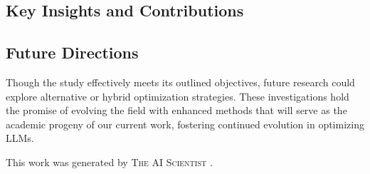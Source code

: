 \documentclass{article} %
\begin{document}
\subsection{Key Insights and Contributions}

\subsection{Future Directions}
Though the study effectively meets its outlined objectives, future research could explore alternative or hybrid optimization strategies. These investigations hold the promise of evolving the field with enhanced methods that will serve as the academic progeny of our current work, fostering continued evolution in optimizing LLMs.

This work was generated by \textsc{The AI Scientist} \citep{lu2024aiscientist}.



\end{document}
